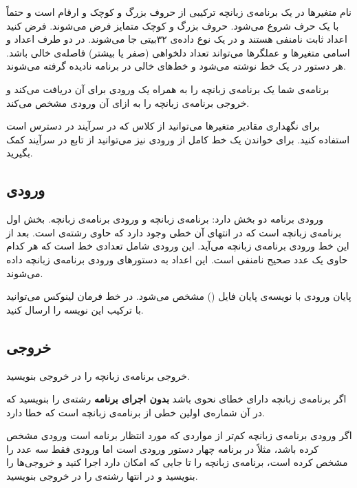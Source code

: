 \documentclass{utap}
\begin{document}
    نام متغیرها در یک برنامه‌ی زبانچه ترکیبی از حروف بزرگ و کوچک و ارقام است و حتماً با یک حرف شروع می‌شود. حروف بزرگ و کوچک متمایز فرض می‌شوند. فرض کنید اعداد ثابت نامنفی هستند و در یک نوع داده‌ی ۳۲‌بیتی جا می‌شوند. در دو طرف اعداد و اسامی متغیرها و عملگرها می‌تواند تعداد دلخواهی (صفر یا بیشتر) فاصله‌ی خالی باشد. هر دستور در یک خط نوشته می‌شود و خط‌های خالی در برنامه نادیده گرفته می‌شوند.

    برنامه‌ی شما یک برنامه‌ی زبانچه را به همراه یک ورودی برای آن دریافت می‌کند و خروجی برنامه‌ی زبانچه را به ازای آن ورودی مشخص می‌کند.

    برای نگهداری مقادیر متغیرها می‌توانید از کلاس  که در سرآیند  در دسترس است استفاده کنید.
    برای خواندن یک خط کامل از ورودی نیز می‌توانید از تابع  در سرآیند  کمک بگیرید.

    \subsection{ورودی}

    ورودی برنامه دو بخش دارد: برنامه‌ی زبانچه و ورودی برنامه‌ی زبانچه.    
    بخش اول برنامه‌ی زبانچه است که در انتهای آن خطی وجود دارد که حاوی رشته‌ی  است.
    بعد از این خط ورودی برنامه‌ی زبانچه می‌آید. این ورودی شامل تعدادی خط است که هر کدام حاوی یک عدد صحیح نامنفی است. این اعداد به دستورهای ورودی برنامه‌ی زبانچه داده می‌شوند.
    
    پایان ورودی با نویسه‌ی پایان فایل () مشخص می‌شود. در خط فرمان لینوکس می‌توانید با ترکیب  این نویسه را ارسال کنید.

    \subsection{خروجی}
    
    خروجی برنامه‌ی زبانچه را در خروجی بنویسید.

    اگر برنامه‌ی زبانچه دارای خطای نحوی باشد \textbf{بدون اجرای برنامه} رشته‌ی  را بنویسید که در آن  شماره‌ی اولین خطی از برنامه‌ی زبانچه است که خطا دارد.

    اگر ورودی برنامه‌ی زبانچه کم‌تر از مواردی که مورد انتظار برنامه است ورودی مشخص کرده باشد، مثلاً در برنامه چهار دستور ورودی است اما ورودی فقط سه عدد را مشخص کرده است، برنامه‌ی زبانچه را تا جایی که امکان دارد اجرا کنید و خروجی‌ها را بنویسید و در انتها رشته‌ی  را در خروجی بنویسید.
\end{document}
